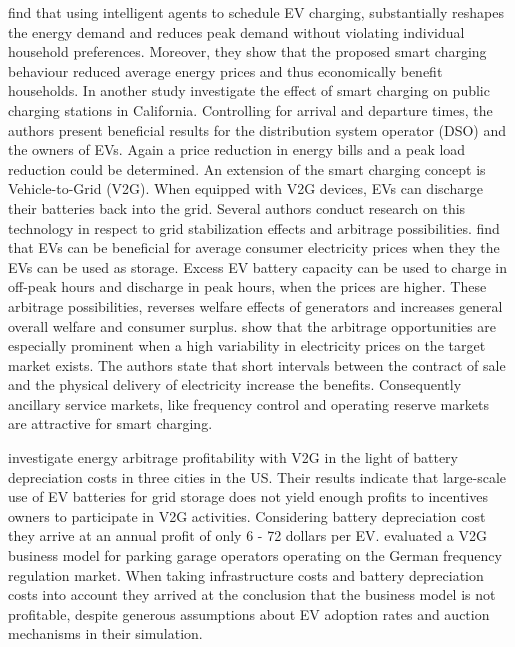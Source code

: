 \documentclass[12pt, article]{article}
\begin{document}
\textcite{valogianni14_effec_manag_elect_vehic_storag} find that using intelligent
agents to schedule EV charging, substantially reshapes the energy demand and
reduces peak demand without violating individual household preferences. Moreover,
they show that the proposed smart charging behaviour reduced average energy
prices and thus economically benefit households. In another study
\textcite{kara15_estim_benef_elect_vehic_smart} investigate the effect of smart
charging on public charging stations in California. Controlling for
arrival and departure times, the authors present beneficial results for the
distribution system operator (DSO) and the owners of EVs. Again a price
reduction in energy bills and a peak load reduction could be determined.
An extension of the smart charging concept is Vehicle-to-Grid (V2G). When
equipped with V2G devices, EVs can discharge their batteries back into the grid.
Several authors conduct research on this technology in respect to grid stabilization
effects and arbitrage possibilities.
\textcite{schill11_elect_vehic_imper_elect_market} find that EVs can be beneficial
for average consumer electricity prices when they the EVs can be used as storage.
Excess EV battery capacity can be used to charge in off-peak hours and discharge
in peak hours, when the prices are higher. These arbitrage possibilities,
reverses welfare effects of generators and increases general overall welfare and
consumer surplus. \textcite{tomic07_using_fleet_elect_drive_vehic_grid_suppor}
show that the arbitrage opportunities are especially prominent when a high
variability in electricity prices on the target market exists. The authors state
that short intervals between the contract of sale and the physical delivery of
electricity increase the benefits. Consequently ancillary service markets, like
frequency control and operating reserve markets are attractive for smart
charging.

\textcite{peterson10_econom_using_plug_in_hybrid} investigate energy arbitrage
profitability with V2G in the light of battery depreciation costs in three
cities in the US. Their results indicate that large-scale use of EV batteries
for grid storage does not yield enough profits to incentives owners to
participate in V2G activities. Considering battery depreciation cost they arrive
at an annual profit of only 6 - 72 dollars per EV.
\textcite{brandt17_evaluat_busin_model_vehic_grid_integ} evaluated a V2G business
model for parking garage operators operating on the German frequency regulation
market. When taking infrastructure costs and battery depreciation costs into
account they arrived at the conclusion that the business model is not
profitable, despite generous assumptions about EV adoption rates and auction
mechanisms in their simulation.
\end{document}
